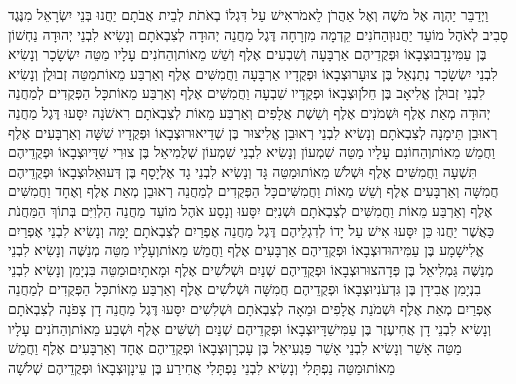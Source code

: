 \documentclass[../main/main.tex]{subfiles}
\begin{document}
\begin{multicols*}{\ncols}
וַיְדַבֵּר יַהְוֶה אֶל מֹשֶׁה וְאֶל אַהֲרֹן לֵאמֹר\PreVerseSpace{}אִישׁ עַל דִּגְלוֹ בְאֹתֹת לְבֵית אֲבֹתָם יַחֲנוּ בְּנֵי יִשְׂרָאֵל מִנֶּגֶד סָבִיב לְאֹהֶל מוֹעֵד יַחֲנוּ\PreVerseSpace{}וְהַחֹנִים קֵדְמָה מִזְרָחָה דֶּגֶל מַחֲנֵה יְהוּדָה לְצִבְאֹתָם וְנָשִׂיא לִבְנֵי יְהוּדָה נַחְשׁוֹן בֶּן עַמִּינָדָב\PreVerseSpace{}וּצְבָאוֹ וּפְקֻדֵיהֶם אַרְבָּעָה וְשִׁבְעִים אֶלֶף וְשֵׁשׁ מֵאוֹת\PreVerseSpace{}וְהַחֹנִים עָלָיו מַטֵּה יִשְׂשָׂכָר וְנָשִׂיא לִבְנֵי יִשְׂשָׂכָר נְתַנְאֵל בֶּן צוּעָר\PreVerseSpace{}וּצְבָאוֹ וּפְקֻדָיו אַרְבָּעָה וַחֲמִשִּׁים אֶלֶף וְאַרְבַּע מֵאוֹת\PreVerseSpace{}מַטֵּה זְבוּלֻן וְנָשִׂיא לִבְנֵי זְבוּלֻן אֱלִיאָב בֶּן חֵלֹן\PreVerseSpace{}וּצְבָאוֹ וּפְקֻדָיו שִׁבְעָה וַחֲמִשִּׁים אֶלֶף וְאַרְבַּע מֵאוֹת\PreVerseSpace{}כָּל הַפְּקֻדִים לְמַחֲנֵה יְהוּדָה מְאַת אֶלֶף וּשְׁמֹנִים אֶלֶף וְשֵׁשֶׁת אֲלָפִים וְאַרְבַּע מֵאוֹת לְצִבְאֹתָם רִאשֹׁנָה יִסָּעוּ \ClosedSection{}דֶּגֶל מַחֲנֵה רְאוּבֵן תֵּימָנָה לְצִבְאֹתָם וְנָשִׂיא לִבְנֵי רְאוּבֵן אֱלִיצוּר בֶּן שְׁדֵיאוּר\PreVerseSpace{}וּצְבָאוֹ וּפְקֻדָיו שִׁשָּׁה וְאַרְבָּעִים אֶלֶף וַחֲמֵשׁ מֵאוֹת\PreVerseSpace{}וְהַחוֹנִם עָלָיו מַטֵּה שִׁמְעוֹן וְנָשִׂיא לִבְנֵי שִׁמְעוֹן שְׁלֻמִיאֵל בֶּן צוּרִי שַׁדָּי\PreVerseSpace{}וּצְבָאוֹ וּפְקֻדֵיהֶם תִּשְׁעָה וַחֲמִשִּׁים אֶלֶף וּשְׁלֹשׁ מֵאוֹת\PreVerseSpace{}וּמַטֵּה גָּד וְנָשִׂיא לִבְנֵי גָד אֶלְיָסָף בֶּן דְּעוּאֵל\SubEnd{}\PreVerseSpace{}וּצְבָאוֹ וּפְקֻדֵיהֶם חֲמִשָּׁה וְאַרְבָּעִים אֶלֶף וְשֵׁשׁ מֵאוֹת וַחֲמִשִּׁים\PreVerseSpace{}כָּל הַפְּקֻדִים לְמַחֲנֵה רְאוּבֵן מְאַת אֶלֶף וְאֶחָד וַחֲמִשִּׁים אֶלֶף וְאַרְבַּע מֵאוֹת וַחֲמִשִּׁים לְצִבְאֹתָם וּשְׁנִיִּם יִסָּעוּ \ClosedSection{}וְנָסַע אֹהֶל מוֹעֵד מַחֲנֵה הַלְוִיִּם בְּתוֹךְ הַמַּחֲנֹת כַּאֲשֶׁר יַחֲנוּ כֵּן יִסָּעוּ אִישׁ עַל יָדוֹ לְדִגְלֵיהֶם \ClosedSection{}דֶּגֶל מַחֲנֵה אֶפְרַיִם לְצִבְאֹתָם יָמָּה וְנָשִׂיא לִבְנֵי אֶפְרַיִם אֱלִישָׁמָע בֶּן עַמִּיהוּד\PreVerseSpace{}וּצְבָאוֹ וּפְקֻדֵיהֶם אַרְבָּעִים אֶלֶף וַחֲמֵשׁ מֵאוֹת\PreVerseSpace{}וְעָלָיו מַטֵּה מְנַשֶּׁה וְנָשִׂיא לִבְנֵי מְנַשֶּׁה גַּמְלִיאֵל בֶּן פְּדָהצוּר\PreVerseSpace{}וּצְבָאוֹ וּפְקֻדֵיהֶם שְׁנַיִם וּשְׁלֹשִׁים אֶלֶף וּמָאתָיִם\PreVerseSpace{}וּמַטֵּה בִּנְיָמִן וְנָשִׂיא לִבְנֵי בִנְיָמִן אֲבִידָן בֶּן גִּדְעֹנִי\PreVerseSpace{}וּצְבָאוֹ וּפְקֻדֵיהֶם חֲמִשָּׁה וּשְׁלֹשִׁים אֶלֶף וְאַרְבַּע מֵאוֹת\PreVerseSpace{}כָּל הַפְּקֻדִים לְמַחֲנֵה אֶפְרַיִם מְאַת אֶלֶף וּשְׁמֹנַת אֲלָפִים וּמֵאָה לְצִבְאֹתָם וּשְׁלִשִׁים יִסָּעוּ \ClosedSection{}דֶּגֶל מַחֲנֵה דָן צָפֹנָה לְצִבְאֹתָם וְנָשִׂיא לִבְנֵי דָן אֲחִיעֶזֶר בֶּן עַמִּישַׁדָּי\PreVerseSpace{}וּצְבָאוֹ וּפְקֻדֵיהֶם שְׁנַיִם וְשִׁשִּׁים אֶלֶף וּשְׁבַע מֵאוֹת\PreVerseSpace{}וְהַחֹנִים עָלָיו מַטֵּה אָשֵׁר וְנָשִׂיא לִבְנֵי אָשֵׁר פַּגְעִיאֵל בֶּן עָכְרָן\PreVerseSpace{}וּצְבָאוֹ וּפְקֻדֵיהֶם אֶחָד וְאַרְבָּעִים אֶלֶף וַחֲמֵשׁ מֵאוֹת\PreVerseSpace{}וּמַטֵּה נַפְתָּלִי וְנָשִׂיא לִבְנֵי נַפְתָּלִי אֲחִירַע בֶּן עֵינָן\PreVerseSpace{}וּצְבָאוֹ וּפְקֻדֵיהֶם שְׁלֹשָׁה 
\end{multicols*}
\end{document}
